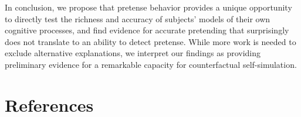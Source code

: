 \documentclass[10pt, letterpaper]{article}
\begin{document}
In conclusion, we propose that pretense behavior provides a unique
opportunity to directly test the richness and accuracy of subjects'
models of their own cognitive processes, and find evidence for accurate
pretending that surprisingly does not translate to an ability to detect
pretense. While more work is needed to exclude alternative explanations,
we interpret our findings as providing preliminary evidence for a
remarkable capacity for counterfactual self-simulation.

\hypertarget{references}{%
\section{References}\label{references}}

\setlength{\parindent}{-0.1in} 
\setlength{\leftskip}{0.125in}

\noindent
\end{document}
